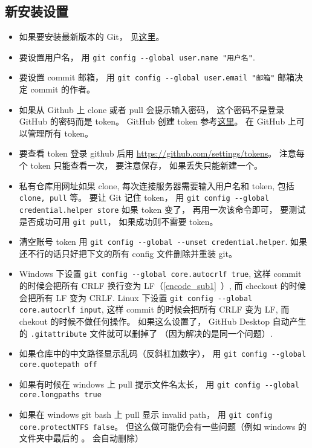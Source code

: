 \subsection{新安装设置}
\begin{itemize}
\item 如果要安装最新版本的 Git， 见\href{https://git-scm.com/downloads}{这里}。
\item 要设置用户名， 用 \verb|git config --global user.name "用户名"|.
\item 要设置 commit 邮箱， 用 \verb|git config --global user.email "邮箱"|  邮箱决定 commit 的作者。
\item 如果从 Github 上 clone 或者 pull 会提示输入密码， 这个密码不是登录 GitHub 的密码而是 token。 GitHub 创建 token 参考\href{https://docs.github.com/en/github/authenticating-to-github/keeping-your-account-and-data-secure/creating-a-personal-access-token#creating-a-token}{这里}。 在 GitHub 上可以管理所有 token。
\item 要查看 token 登录 github 后用 \href{https://github.com/settings/tokens/}{https://github.com/settings/tokens}。 注意每个 token 只能查看一次， 要注意保存， 如果丢失只能新建一个。
\item 私有仓库用网址如果 clone, 每次连接服务器需要输入用户名和 token, 包括 \verb|clone, pull| 等。 要让 Git 记住 token， 用 \verb|git config --global credential.helper store| 如果 token 变了， 再用一次该命令即可， 要测试是否成功可用 \verb|git pull|， 如果成功则不需要 token。
\item 清空账号 token 用 \verb|git config --global --unset credential.helper|. 如果还不行的话只好把下文的所有 config 文件删除并重装 git。
\item Windows 下设置 \verb|git config --global core.autocrlf true|, 这样 commit 的时候会把所有 CRLF 换行变为 LF（\autoref{encode_sub1}~）, 而 checkout 的时候会把所有 LF 变为 CRLF. Linux 下设置 \verb|git config --global core.autocrlf input|, 这样 commit 的时候会把所有 CRLF 变为 LF, 而 chekout 的时候不做任何操作。 如果这么设置了， GitHub Desktop 自动产生的 \verb|.gitattribute| 文件就可以删掉了 （因为解决的是同一个问题）.
\item 如果仓库中的中文路径显示乱码（反斜杠加数字）， 用 \verb|git config --global core.quotepath off|
\item 如果有时候在 windows 上 pull 提示文件名太长， 用 \verb|git config --global core.longpaths true|
\item 如果在 windows git bash 上 pull 显示 invalid path， 用 \verb|git config core.protectNTFS false|。 但这么做可能仍会有一些问题（例如 windows 的文件夹中最后的 。 会自动删除）

\end{itemize}
